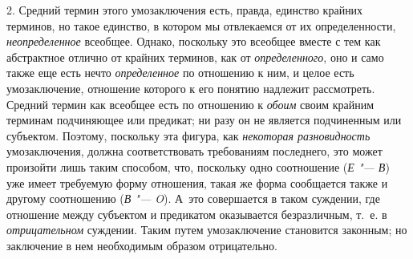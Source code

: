 2. Средний термин этого умозаключения есть, правда, единство
крайних терминов, но такое единство, в котором мы отвлекаемся от их
определенности, {\em неопределенное}
всеобщее. Однако, поскольку это всеобщее вместе с тем как
абстрактное отлично от крайних терминов, как от
{\em определенного}, оно
и само также еще есть нечто
{\em определенное} по
отношению к ним, и целое есть умозаключение, отношение которого к его
понятию надлежит рассмотреть. Средний термин как всеобщее есть по отношению
к {\em обоим} своим
крайним терминам подчиняющее или предикат; ни разу он не является
подчиненным или субъектом. Поэтому, поскольку эта фигура, как
{\em некоторая разновидность}
умозаключения, должна соответствовать требованиям последнего,
это может произойти лишь таким способом, что, поскольку одно соотношение
({\em Е "--- В})
уже имеет требуемую форму отношения, такая же форма
сообщается также и другому соотношению
({\em В "--- O}). А~это
совершается в таком суждении, где отношение между субъектом и предикатом
оказывается безразличным, т.~е. в
{\em отрицательном}
суждении. Таким путем умозаключение становится законным; но
заключение в нем необходимым образом
отрицательно.

